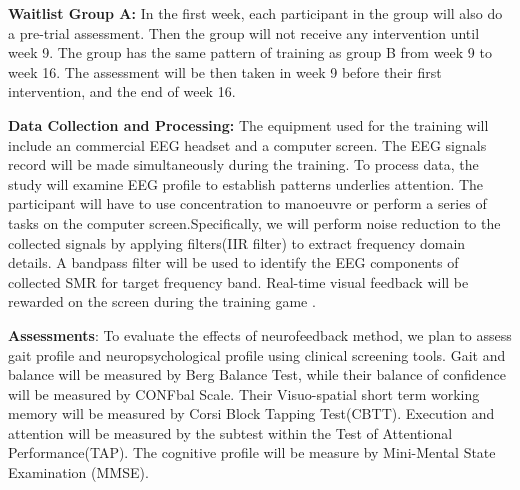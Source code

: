 \documentclass{article}
\begin{document}
\textbf{Waitlist Group A:}
In the first week, each participant in the group will also do a pre-trial assessment. Then the group will not receive any intervention until week 9. The group has the same pattern of training as group B from week 9 to week 16. The assessment will be then taken in week 9 before their first intervention, and the end of week 16.

\textbf{Data Collection and Processing:} The equipment used for the training  will include an commercial EEG headset and a computer screen. The EEG signals record will be made simultaneously during the training. To process data, the study will examine EEG profile to establish patterns underlies attention.  The participant will have to use concentration to manoeuvre or perform a series of tasks on the computer screen.Specifically, we will perform noise reduction to the collected signals by applying filters(IIR filter) to extract frequency domain details. A bandpass filter will be used to identify the EEG components of collected SMR for target frequency band. Real-time visual feedback will be rewarded on the screen during the training game \cite{Kober_2015}.

\textbf{Assessments}: To evaluate the effects of neurofeedback method, we plan to assess gait profile and neuropsychological profile using clinical screening tools. Gait and balance will be measured by Berg Balance Test, while their balance of confidence will be measured by CONFbal Scale. Their Visuo-spatial short term working memory will be measured by Corsi Block Tapping Test(CBTT). Execution and attention will be measured by the subtest within the Test of Attentional Performance(TAP). The cognitive profile will be measure by Mini-Mental State Examination (MMSE).

\begin{comment}
Gait and balance will be measured by Berg Balance Test, while their balance of confidence will be measured by CONFbal Scale. Frailty will be measured by Rockwood Frailty Score. Fall risk will be assessed by FRAT. Performance of daily living activity will be measured by Barthel. The cognitive profile will be measure by Mini-Mental State Examination (MMSE)\cite{Folstein_1975}. \textcolor{red}{(to be determined)}
\end{comment}


\begin{comment}
RBANS takes ~30 minutes to finish, which could be tiring to take for older people. \cite{Nouchi_2012} has some cognitive measurements
\end{comment}
\end{document}
